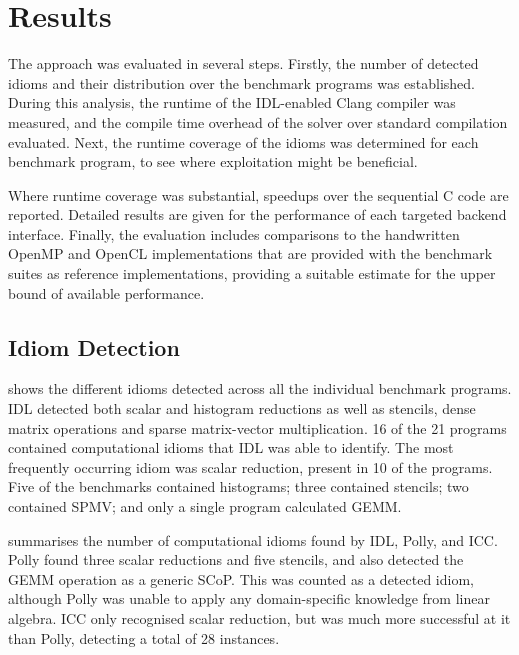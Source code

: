 \section{Results}
\label{sec:idiomresults}

    The approach was evaluated in several steps.
    Firstly, the number of detected idioms and their distribution over the
    benchmark programs was established.
    During this analysis, the runtime of the IDL-enabled Clang compiler was
    measured, and the compile time overhead of the solver over standard
    compilation evaluated.
    Next, the runtime coverage of the idioms was determined for each
    benchmark program, to see where exploitation might be beneficial.

    Where runtime coverage was substantial, speedups over the sequential C code
    are reported.
    Detailed results are given for the performance of each targeted backend
    interface.
    Finally, the evaluation includes comparisons to the handwritten OpenMP and
    OpenCL implementations that are provided with the benchmark suites as
    reference implementations, providing a suitable estimate for the upper
    bound of available performance.

\subsection{Idiom Detection}

     shows the different idioms detected across
    all the individual benchmark programs.
    IDL detected both scalar and histogram reductions as well as stencils, dense
    matrix operations and sparse matrix-vector multiplication.
    16 of the 21 programs contained computational idioms that IDL was able to
    identify.
    The most frequently occurring idiom was scalar reduction, present in 10
    of the programs.
    Five of the benchmarks contained histograms; three contained stencils;
    two contained SPMV; and only a single program calculated GEMM.

     summarises the number of computational idioms found by
    IDL, Polly, and ICC.
    Polly found three scalar reductions and five stencils, and also detected the
    GEMM operation as a generic SCoP.
    This was counted as a detected idiom, although Polly was unable to apply any
    domain-specific knowledge from linear algebra.
    ICC only recognised scalar reduction, but was much more successful at it
    than Polly, detecting a total of 28 instances.

